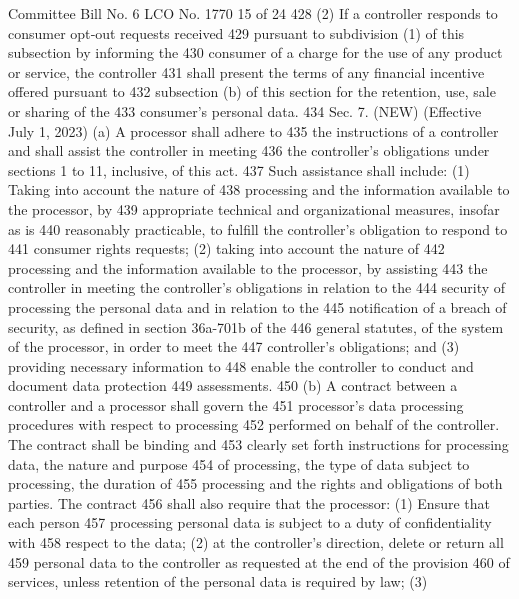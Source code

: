 Committee Bill No. 6
LCO No. 1770 15 of 24
428 (2) If a controller responds to consumer opt‐out requests received
429 pursuant to subdivision (1) of this subsection by informing the
430 consumer of a charge for the use of any product or service, the controller
431 shall present the terms of any financial incentive offered pursuant to
432 subsection (b) of this section for the retention, use, sale or sharing of the
433 consumer's personal data.
434 Sec. 7. (NEW) (Effective July 1, 2023) (a) A processor shall adhere to
435 the instructions of a controller and shall assist the controller in meeting
436 the controller's obligations under sections 1 to 11, inclusive, of this act.
437 Such assistance shall include: (1) Taking into account the nature of
438 processing and the information available to the processor, by
439 appropriate technical and organizational measures, insofar as is
440 reasonably practicable, to fulfill the controller's obligation to respond to
441 consumer rights requests; (2) taking into account the nature of
442 processing and the information available to the processor, by assisting
443 the controller in meeting the controller's obligations in relation to the
444 security of processing the personal data and in relation to the
445 notification of a breach of security, as defined in section 36a-701b of the
446 general statutes, of the system of the processor, in order to meet the
447 controller's obligations; and (3) providing necessary information to
448 enable the controller to conduct and document data protection
449 assessments.
450 (b) A contract between a controller and a processor shall govern the
451 processor's data processing procedures with respect to processing
452 performed on behalf of the controller. The contract shall be binding and
453 clearly set forth instructions for processing data, the nature and purpose
454 of processing, the type of data subject to processing, the duration of
455 processing and the rights and obligations of both parties. The contract
456 shall also require that the processor: (1) Ensure that each person
457 processing personal data is subject to a duty of confidentiality with
458 respect to the data; (2) at the controller's direction, delete or return all
459 personal data to the controller as requested at the end of the provision
460 of services, unless retention of the personal data is required by law; (3) 


